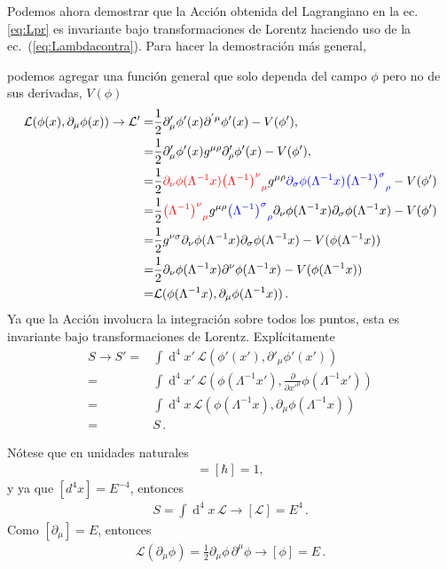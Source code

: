 Podemos ahora demostrar que la Acción obtenida del Lagrangiano en la ec.\eqref{eq:Lpr} es invariante bajo transformaciones de Lorentz haciendo uso de la ec.~(\ref{eq:Lambdacontra}). Para hacer la demostración más general,
\begin{frame}
podemos agregar una función general que solo dependa del campo $\phi$ pero no de sus derivadas, $V(\phi)$
\begin{align}
  \mathcal{L}(\phi(x),\partial_{\mu}\phi(x))\to  \mathcal{L}'=& \frac{1}{2}\partial'_\mu\phi'(x)\partial^{'\mu}\phi'(x)-V(\phi'), \nonumber\\
   =& \frac{1}{2}\partial'_\mu\phi'(x)g^{\mu \rho}\partial'_{\rho}\phi'(x)-V(\phi'), \nonumber\\
   =&\frac{1}{2}{\color{red}\partial_\nu\phi(\Lambda^{-1}x) {\left(\Lambda^{-1}\right)^\nu}_\mu} g^{\mu \rho} {\color{blue}\partial_\sigma \phi(\Lambda^{-1}x){\left(\Lambda^{-1}\right)^\sigma}_\rho}  -V(\phi')\nonumber\\
  =&\frac{1}{2}{\color{red}{\left(\Lambda^{-1}\right)^\nu}_\mu} g^{\mu \rho}{\color{blue}{\left(\Lambda^{-1}\right)^\sigma}_\rho} \partial_\nu\phi(\Lambda^{-1}x) \partial_\sigma \phi(\Lambda^{-1}x) -V(\phi')\nonumber\\
  =&\frac{1}{2} g^{\nu \sigma}\partial_\nu\phi(\Lambda^{-1}x) \partial_\sigma \phi(\Lambda^{-1}x) -V(\phi(\Lambda^{-1}x))\nonumber\\
  =&\frac{1}{2} \partial_\nu\phi(\Lambda^{-1}x) \partial^{\nu} \phi(\Lambda^{-1}x) -V(\phi(\Lambda^{-1}x)) \nonumber\\
  =&\mathcal{L}(\phi(\Lambda^{-1}x),\partial_{\mu}\phi(\Lambda^{-1}x))\,.
\end{align}
Ya que la Acción involucra la integración sobre todos los puntos, esta es invariante bajo transformaciones de Lorentz. Explícitamente
\begin{align}
  S\to S'=&\int\operatorname{d}^4x'\,\mathcal{L}(\phi'(x'),\partial'_{\mu}\phi'(x') ) \nonumber\\
=&\int\operatorname{d}^4x'\,\mathcal{L}\left( \phi(\Lambda^{-1}x'),\frac{\partial}{\partial {x'}^{\mu}}\phi(\Lambda^{-1}x') \right) \nonumber\\  
=&\int\operatorname{d}^4x\, \mathcal{L}(\phi(\Lambda^{-1}x),\partial_{\mu}\phi(\Lambda^{-1}x))\nonumber\\
=&S\,.
\end{align}
\end{frame}

\begin{frame}
Nótese que en unidades naturales
\begin{align}
  [S]=[\hbar]=1,
\end{align}
y ya que $[d^4x]=E^{-4}$, entonces
\begin{align}
 S=\int\operatorname{d}^4x\,\mathcal{L}\to [\mathcal{L}]=E^{4}\,.
\end{align}
Como $[\partial_{\mu}]=E$, entonces
\begin{align}
 \mathcal{L}(\partial_{\mu}\phi) =\frac{1}{2}{\partial_\mu\phi}\,{\partial^\mu\phi}\to [\phi]=E\,.
\end{align}

\end{frame}
 
